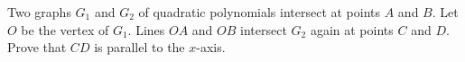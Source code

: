 Two graphs $G_1$ and $G_2$ of quadratic polynomials intersect at points $A$ and $B$. Let $O$ be the vertex of $G_1$. Lines $OA$ and $OB$ intersect $G_2$ again at points $C$ and $D$. Prove that $CD$ is parallel to the $x$-axis.